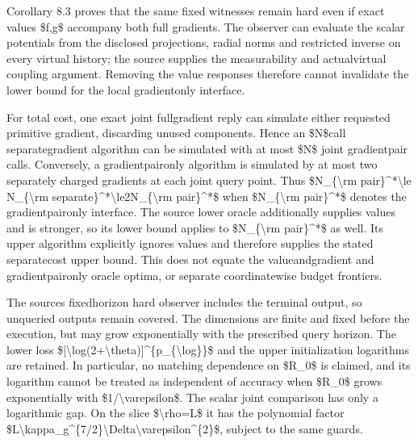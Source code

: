 \documentclass[10pt,a4paper]{article}
\begin{document}
Corollary 8.3 proves that the same fixed witnesses remain hard even if exact values \$f,g\$ accompany both full gradients. The observer can evaluate the scalar potentials from the disclosed projections, radial norms and restricted inverse on every virtual history; the source supplies the measurability and actualvirtual coupling argument. Removing the value responses therefore cannot invalidate the lower bound for the local gradientonly interface.

For total cost, one exact joint fullgradient reply can simulate either requested primitive gradient, discarding unused components. Hence an \$N\$call separategradient algorithm can be simulated with at most \$N\$ joint gradientpair calls. Conversely, a gradientpaironly algorithm is simulated by at most two separately charged gradients at each joint query point. Thus \$N\_\{\textbackslash{}rm pair\}\textasciicircum{}*\textbackslash{}le N\_\{\textbackslash{}rm separate\}\textasciicircum{}*\textbackslash{}le2N\_\{\textbackslash{}rm pair\}\textasciicircum{}*\$ when \$N\_\{\textbackslash{}rm pair\}\textasciicircum{}*\$ denotes the gradientpaironly interface. The source lower oracle additionally supplies values and is stronger, so its lower bound applies to \$N\_\{\textbackslash{}rm pair\}\textasciicircum{}*\$ as well. Its upper algorithm explicitly ignores values and therefore supplies the stated separatecost upper bound. This does not equate the valueandgradient and gradientpaironly oracle optima, or separate coordinatewise budget frontiers.

The sources fixedhorizon hard observer includes the terminal output, so unqueried outputs remain covered. The dimensions are finite and fixed before the execution, but may grow exponentially with the prescribed query horizon. The lower loss \$[\textbackslash{}log(2+\textbackslash{}theta)]\textasciicircum{}\{p\_\{\textbackslash{}log\}\}\$ and the upper initialization logarithms are retained. In particular, no matching dependence on \$R\_0\$ is claimed, and its logarithm cannot be treated as independent of accuracy when \$R\_0\$ grows exponentially with \$1/\textbackslash{}varepsilon\$. The scalar joint comparison has only a logarithmic gap. On the slice \$\textbackslash{}rho=L\$ it has the polynomial factor \$L\textbackslash{}kappa\_g\textasciicircum{}\{7/2\}\textbackslash{}Delta\textbackslash{}v\allowbreak{}arepsilon\textasciicircum{}\{2\}\$, subject to the same guards.
\end{document}
